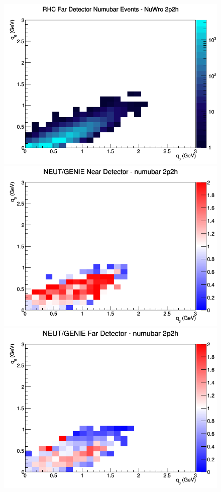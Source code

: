 \begin{figure}[h]
\endminipage
{}
\includegraphics[width=\linewidth]{eff_q0_q3/LAr/2p2h_RHC_FD_numubar_q3_q0_NuWro.png}
\endminipage
\newline
{}
\includegraphics[width=\linewidth]{eff_q0_q3/LAr/ratios/2p2h_NEUT_GENIE_numubar_near_q3_q0.png}
\endminipage
{}
\includegraphics[width=\linewidth]{eff_q0_q3/LAr/ratios/2p2h_NEUT_GENIE_numubar_far_q3_q0.png}

\end{figure}
